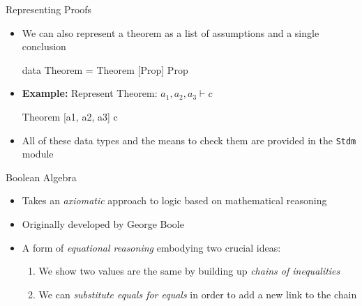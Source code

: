 \documentclass[11pt,t,pdf,xcolor=svgnames,aspectratio=169]{beamer}
\newenvironment{Shaded}{\begin{snugshade}}{\end{snugshade}}
\newcommand{\DataTypeTok}[1]{\textcolor[rgb]{0.87,0.87,0.75}{#1}}
\newcommand{\KeywordTok}[1]{\textcolor[rgb]{0.94,0.87,0.69}{#1}}
\newcommand{\NormalTok}[1]{\textcolor[rgb]{0.80,0.80,0.80}{#1}}
\newcommand{\OtherTok}[1]{\textcolor[rgb]{0.94,0.94,0.56}{#1}}
\providecommand{\tightlist}{%
  \setlength{\itemsep}{5pt}\setlength{\parskip}{0pt}}
\begin{document}
\begin{frame}[fragile]{Representing Proofs}
\protect\hypertarget{representing-proofs-1}{}
\begin{itemize}
\item
  We can also represent a theorem as a list of assumptions and a single
  conclusion

\begin{Shaded}
\begin{Highlighting}[]
  \KeywordTok{data} \DataTypeTok{Theorem} \OtherTok{=} \DataTypeTok{Theorem}\NormalTok{ [}\DataTypeTok{Prop}\NormalTok{] }\DataTypeTok{Prop}
\end{Highlighting}
\end{Shaded}
\item
  \textbf{Example:} Represent Theorem: \(a_1, a_2, a_3 \vdash c\)

\begin{Shaded}
\begin{Highlighting}[]
  \DataTypeTok{Theorem}\NormalTok{ [a1, a2, a3] c}
\end{Highlighting}
\end{Shaded}
\item
  All of these data types and the means to check them are provided in
  the \texttt{Stdm} module
\end{itemize}
\end{frame}


\begin{frame}{Boolean Algebra}
\protect\hypertarget{boolean-algebra}{}
\begin{itemize}
\item
  Takes an \emph{axiomatic} approach to logic based on mathematical
  reasoning
\item
  Originally developed by George Boole
\item
  A form of \emph{equational reasoning} embodying two crucial ideas:

  \begin{enumerate}
  \tightlist
  \item
    We show two values are the same by building up \emph{chains of
    inequalities}
  \item
    We can \emph{substitute equals for equals} in order to add a new
    link to the chain
  \end{enumerate}
\end{itemize}
\end{frame}
\end{document}
